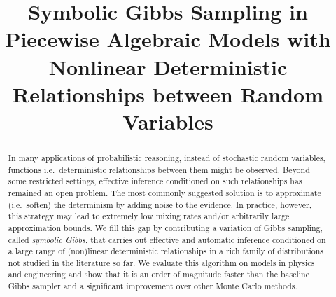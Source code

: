 \documentclass[]{article}
\title{Symbolic Gibbs Sampling in Piecewise Algebraic %
Models with Nonlinear Deterministic Relationships between Random Variables}
\author{} %
\begin{document}
\maketitle

\begin{abstract}
In many applications of probabilistic reasoning, 
instead of stochastic random variables, 
functions i.e.\ deterministic relationships between them
might be observed.
Beyond some restricted settings, effective inference conditioned on such relationships has remained an open problem. %
%
The most commonly suggested solution is to approximate (i.e.\ soften) the determinism by adding noise to the 
evidence. %
In practice, however, this strategy may 
lead to extremely low mixing rates and/or arbitrarily large approximation bounds. 
%
We fill this gap by contributing a variation of Gibbs sampling, called \emph{symbolic Gibbs}, 
that carries out effective and automatic inference conditioned on a large range of (non)linear
deterministic relationships in a rich family of distributions not studied in the literature so far.
We evaluate this algorithm on models in physics and engineering and show that it is an order of magnitude faster than the baseline Gibbs sampler and a significant improvement over other Monte Carlo methods.  
\end{abstract}
\end{document}

